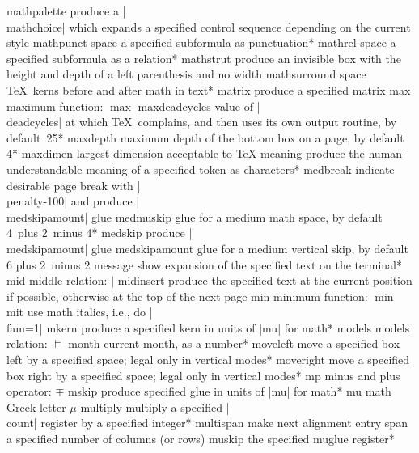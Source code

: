 \capcs mathpalette {produce a |\\mathchoice| which expands a specified 
   control sequence depending on the current style}{}{}
\capcs mathpunct {space a specified subformula as punctuation}*{}
\capcs mathrel {space a specified subformula as a relation}*{}
\capcs mathstrut {produce an invisible box with the height and depth of a
   left parenthesis and no width}{}{}
\capcs mathsurround {space \TeX\ kerns before and after math in text}*{}
\capcs matrix {produce a specified matrix}{}{}
\capcs max {maximum function: $\max$}{}{}
\capcs maxdeadcycles {value of |\\deadcycles| at which \TeX\ complains,
   and then uses its own output routine, by default~25}*{}
\capcs maxdepth {maximum depth of the bottom box on a page,
   by default 4\pt}*{}
\capcs maxdimen {largest dimension acceptable to \TeX}{}{}
\capcs meaning {produce the human-understandable meaning of a specified
   token as characters}*{}
\capcs medbreak {indicate desirable page
   break with |\\penalty-100| and produce |\\medskipamount| glue}{}{}
\capcs medmuskip {glue for a medium math space, by default 4\mud\ plus 2\mud\
   minus 4\mud}*{}
\capcs medskip {produce |\\medskipamount| glue}{}{}
\capcs medskipamount {glue for a medium vertical skip, by default 6\pt
   plus 2\pt\ minus 2\pt}{}{}
\capcs message {show expansion of the specified text on the terminal}*{}
\capcs mid {middle relation: $\mid$}{}{}
\capcs midinsert {produce the specified text at the current position if
   possible, otherwise at the top of the next page}{}{}
\capcs min {minimum function: $\min$}{}{}
\capcs mit {use math italics, i.e., do |\\fam=1|}{}{}
\capcs mkern {produce a specified kern in units of |mu| for math}*{}
\capcs models {models relation: $\models$}{}{}
\capcs month {current month, as a number}*{}
\capcs moveleft {move a specified box left by a specified space; legal
   only in vertical modes}*{}
\capcs moveright {move a specified box right by a specified space; legal
   only in vertical modes}*{}
\capcs mp {minus and plus operator: $\mp$}{}{}
\capcs mskip {produce specified glue in units of |mu| for math}*{}
\capcs mu {math Greek letter $\mu$}{}{}
\capcs multiply {multiply a specified |\\count| register by a specified
   integer}*{}
\capcs multispan {make next alignment entry span a specified number of
   columns (or rows)}{}{}
\capcs muskip {the specified muglue register}*{}
